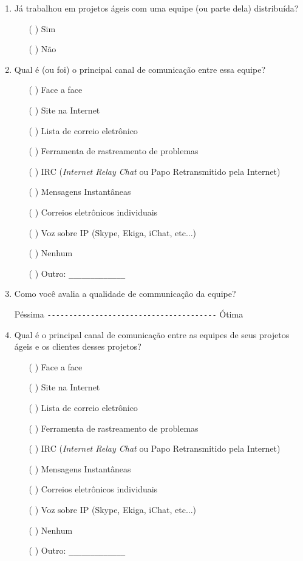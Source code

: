 \begin{enumerate}
\item Já trabalhou em projetos ágeis com uma equipe (ou parte dela)
  distribuída?
  \begin{itemize}
  \item[( )] Sim
  \item[( )] Não
  \end{itemize}

\item Qual é (ou foi) o principal canal de comunicação entre essa
  equipe?
  \begin{itemize}
  \item[( )] Face a face
  \item[( )] Site na Internet
  \item[( )] Lista de correio eletrônico
  \item[( )] Ferramenta de rastreamento de problemas
  \item[( )] IRC (\textit{Internet Relay Chat} ou Papo Retransmitido
    pela Internet)
  \item[( )] Mensagens Instantâneas
  \item[( )] Correios eletrônicos individuais
  \item[( )] Voz sobre IP (Skype, Ekiga, iChat, etc...)
  \item[( )] Nenhum
  \item[( )] Outro: \verb=_____________=
  \end{itemize}

\item Como você avalia a qualidade de communicação da equipe?

  Péssima \verb=---------------------------------------= Ótima

\item Qual é o principal canal de comunicação entre as equipes de seus
  projetos ágeis e os clientes desses projetos?
  \begin{itemize}
  \item[( )] Face a face
  \item[( )] Site na Internet
  \item[( )] Lista de correio eletrônico
  \item[( )] Ferramenta de rastreamento de problemas
  \item[( )] IRC (\textit{Internet Relay Chat} ou Papo Retransmitido
    pela Internet)
  \item[( )] Mensagens Instantâneas
  \item[( )] Correios eletrônicos individuais
  \item[( )] Voz sobre IP (Skype, Ekiga, iChat, etc...)
  \item[( )] Nenhum
  \item[( )] Outro: \verb=_____________=
  \end{itemize}


\end{enumerate}
